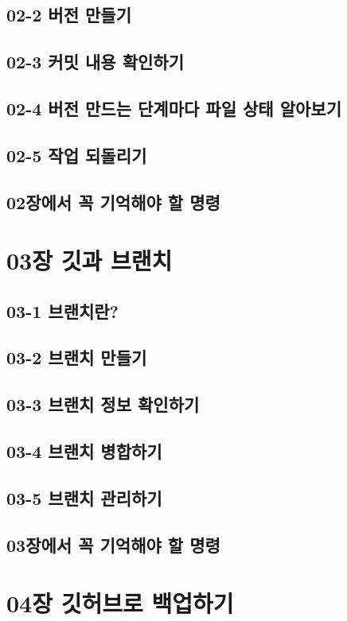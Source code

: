 \documentclass[12pt, a4paper, oneside]{book}
\let\stdsection\section
\renewcommand\section{\newpage\stdsection}
\begin{document}
		\subsection{	02-2 버전 만들기	}		
		\subsection{	02-3 커밋 내용 확인하기	}		
		\subsection{	02-4 버전 만드는 단계마다 파일 상태 알아보기	}		
		\subsection{	02-5 작업 되돌리기	}		
		\subsection{	02장에서 꼭 기억해야 할 명령	}		
						
		\section{	03장 깃과 브랜치	}		
		\subsection{	03-1 브랜치란?	}		
		\subsection{	03-2 브랜치 만들기	}		
		\subsection{	03-3 브랜치 정보 확인하기	}		
		\subsection{	03-4 브랜치 병합하기	}		
		\subsection{	03-5 브랜치 관리하기	}		
		\subsection{	03장에서 꼭 기억해야 할 명령	}		
						
		\section{	04장 깃허브로 백업하기	}		
\end{document}
